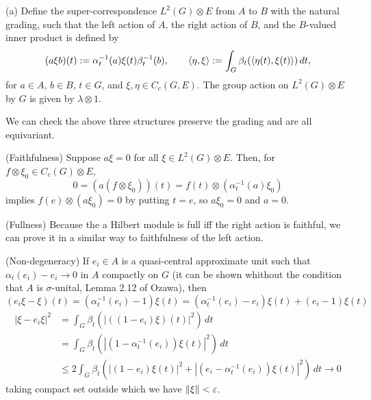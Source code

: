 \documentclass{../../large}
\begin{document}
\begin{pf}
(a)
Define the super-correspondence $L^2(G)\otimes E$ from $A$ to $B$ with the natural grading, such that the left action of $A$, the right action of $B$, and the $B$-valued inner product is defined by
\[(a\xi b)(t):=\alpha_t^{-1}(a)\xi(t)\beta_t^{-1}(b),\qquad\langle\eta,\xi\rangle:=\int_G\beta_t(\langle\eta(t),\xi(t)\rangle)\,dt,\]
for $a\in A$, $b\in B$, $t\in G$, and $\xi,\eta\in C_c(G,E)$.
The group action on $L^2(G)\otimes E$ by $G$ is given by $\lambda\otimes1$.

We can check the above three structures preserve the grading and are all equivariant.

(Faithfulness)
Suppose $a\xi=0$ for all $\xi\in L^2(G)\otimes E$.
Then, for $f\otimes\xi_0\in C_c(G)\otimes E$,
\[0=(a(f\otimes\xi_0))(t)=f(t)\otimes(\alpha_t^{-1}(a)\xi_0)\]
implies $f(e)\otimes(a\xi_0)=0$ by putting $t=e$, so $a\xi_0=0$ and $a=0$.

(Fullness)
Because the a Hilbert module is full iff the right action is faithful, we can prove it in a similar way to faithfulness of the left action.

(Non-degeneracy)
If $e_i\in A$ is a quasi-central approximate unit such that $\alpha_t(e_i)-e_i\to0$ in $A$ compactly on $G$ (it can be shown whithout the condition that $A$ is $\sigma$-unital, Lemma 2.12 of Ozawa), then
\[(e_i\xi-\xi)(t)=(\alpha_t^{-1}(e_i)-1)\xi(t)=(\alpha_t^{-1}(e_i)-e_i)\xi(t)+(e_i-1)\xi(t)\]
\begin{align*}
|\xi-e_i\xi|^2
&=\int_G\beta_t(|((1-e_i)\xi)(t)|^2)\,dt\\
&=\int_G\beta_t(|(1-\alpha_t^{-1}(e_i))\xi(t)|^2)\,dt\\
&\le2\int_G\beta_t(|(1-e_i)\xi(t)|^2+|(e_i-\alpha_t^{-1}(e_i))\xi(t)|^2)\,dt\to0
\end{align*}
taking compact set outside which we have $\|\xi\|<\varepsilon$.

\end{pf}
\end{document}
